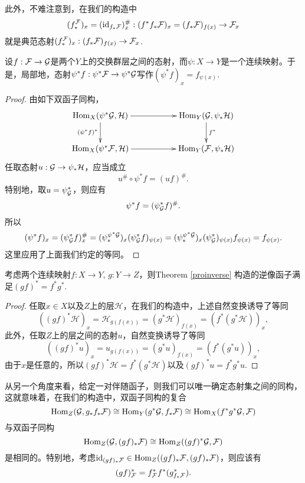 此外，不难注意到，在我们的构造中
\[
	(f^{\mathcal{F}}_*)_x=(\operatorname{id}_{f_*\mathcal{F}})^\#_x:(f^*f_*\mathcal{F})_x=(f_*\mathcal{F})_{f(x)}\to \mathcal{F}_x
\]
就是典范态射$(f^{\mathcal{F}}_*)_x:(f_*\mathcal{F})_{f(x)}\to \mathcal{F}_x$.

\begin{pro}
设$f:\mathcal{F}\to\mathcal{G}$是两个$Y$上的交换群层之间的态射，而$\psi:X\to Y$是一个连续映射。于是，局部地，态射$\psi^*f:\psi^*\mathcal{F}\to \psi^*\mathcal{G}$写作$(\psi^* f)_x=f_{\psi(x)}$.
\end{pro}

\begin{proof}
由如下双函子同构，
\[
	\xymatrix{
		\Hom_X(\psi^*\calg,\mathcal{H})\ar[rr] \ar[d]_{(\psi^*f)^*}&&\Hom_Y(\calg,\psi_*\mathcal{H}) \ar[d]^{f^*}\\
		\Hom_X(\psi^*\calf,\mathcal{H})\ar[rr]&&\Hom_Y(\calf,\psi_*\mathcal{H})
	}
\]
任取态射$u:\mathcal{G}\to \psi_*\mathcal{H}$，应当成立
\[
	u^\#\circ \psi^* f=(uf)^\#.
\]
特别地，取$u=\psi_{\mathcal{G}}^*$，则应有
\[
	\psi^* f=(\psi_{\mathcal{G}}^* f)^\#.
\]
所以
\[
	(\psi^* f)_x=(\psi_{\mathcal{G}}^* f)^\#_x =(\psi_*^{\psi^*\mathcal{G}})_x (\psi_{\mathcal{G}}^* f)_{\psi(x)}=(\psi_*^{\psi^*\mathcal{G}})_x (\psi_{\mathcal{G}}^*)_{\psi(x)} f_{\psi(x)}=f_{\psi(x)}.
\]
这里应用了上面我们约定的等同。
\end{proof}

\begin{pro}[逆像函子的复合]
考虑两个连续映射$f:X\to Y$, $g:Y\to Z$，则Theorem \ref{proinverse} 构造的逆像函子满足$(gf)^*=f^*g^*$.
\end{pro}

\begin{proof}
任取$x\in X$以及$Z$上的层$\mathcal H$，在我们的构造中，上述自然变换诱导了等同
\[
	((gf)^*\mathcal H)_x=\mathcal H_{g(f(x))}=(g^* \mathcal H)_{f(x)}=(f^*(g^*\mathcal H))_x,
\]
此外，任取$Z$上的层之间的态射$u$，自然变换诱导了等同
\[
	((gf)^* u)_x= u_{g(f(x))}=(g^* u)_{f(x)}=(f^*(g^* u))_x,
\]
由于$x$是任意的，所以$(gf)^*\mathcal H=f^*(g^*\mathcal H)$以及$(gf)^* u=f^*g^* u$.
\end{proof}

从另一个角度来看，给定一对伴随函子，则我们可以唯一确定态射集之间的同构，这就意味着，在我们的构造中，双函子同构的复合
\[
	\operatorname{Hom}_Z(\mathcal{G},g_*f_*\mathcal{F})\cong \operatorname{Hom}_Y(g^*\mathcal{G},f_*\mathcal{F})\cong \operatorname{Hom}_X(f^*g^*\mathcal{G},\mathcal{F})
\]
与双函子同构
\[
	\operatorname{Hom}_Z(\mathcal{G},(gf)_*\mathcal{F})\cong \operatorname{Hom}_Z((gf)^*\mathcal{G},\mathcal{F})
\]
是相同的。特别地，考虑$\operatorname{id}_{(gf)_*\mathcal{F}}\in \operatorname{Hom}_Z((gf)_*\mathcal{F},(gf)_*\mathcal{F})$，则应该有
\[
	(gf)^*_{\mathcal{F}} = f_{\mathcal{F}}^* f^*(g_{f_*\mathcal{F}}^*).
\]

